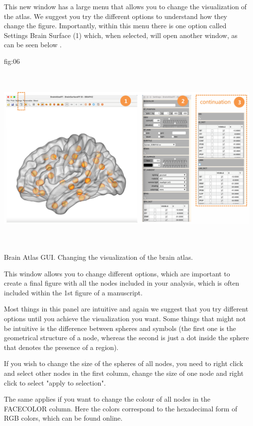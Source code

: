 \documentclass{tufte-handout}
\begin{document}
This new window has a large menu that allows you to change the visualization of the atlas. We suggest you try the different options to understand how they change the figure. Importantly, within this menu there is one option called Settings Brain Surface (1) which, when selected, will open another window, as can be seen below .

	{fig:06}
	{\includegraphics[height=10cm]{tut_ba/fig6.png}}
	{Brain Atlas GUI.}
	{
	Changing the visualization of the brain atlas. 
	}

This window allows you to change different options, which are important to create a final figure with all the nodes included in your analysis, which is often included within the 1st figure of a manuscript.

Most things in this panel are intuitive and again we suggest that you try different options until you achieve the visualization you want.
Some things that might not be intuitive is the difference between spheres and symbols (the first one is the geometrical structure of a node, whereas the second is just a dot inside the sphere that denotes the presence of a region). 

If you wish to change the size of the spheres of all nodes, you need to right click and select other nodes in the first column, change the size of one node and right click to select "apply to selection".

The same applies if you want to change the colour of all nodes in the FACECOLOR column. Here the colors correspond to the hexadecimal form of RGB colors, which can be found online.
\end{document}
